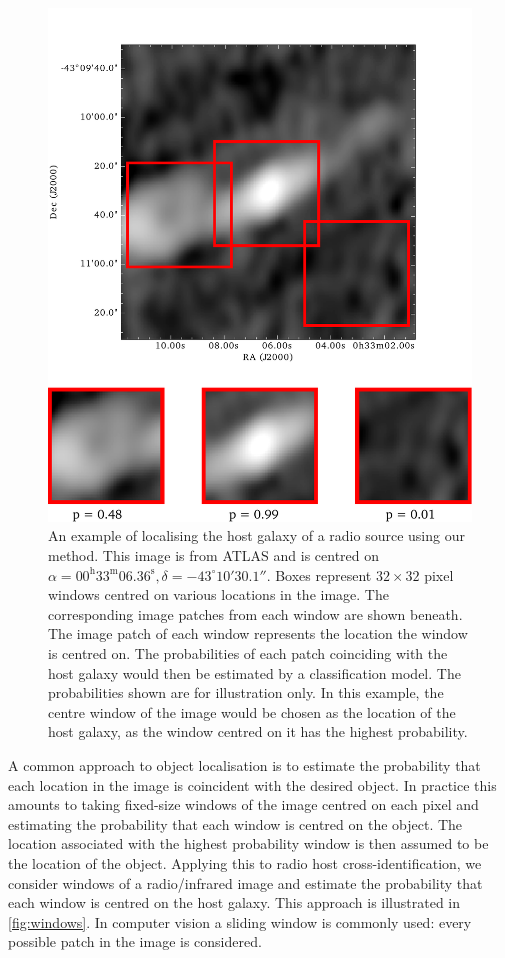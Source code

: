 \documentclass[fleqn,usenatbib,usedcolumn]{mnras}
\newcommand{\text}{\mathrm}
\begin{document}
    \begin{figure}
      \centering
      \includegraphics[width=0.8\columnwidth]{images/elais_0093C1_with_boxes}
      \caption{An example of localising the host galaxy of a radio source using
        our method. This image is from ATLAS and is centred on $\alpha =
        00^\text{h}33^\text{m}06.36^\text{s}, \delta = -43^\circ{}10'30.1''$. Boxes
        represent $32 \times 32$ pixel windows centred on various locations in
        the image. The corresponding image patches from each window are shown
        beneath. The image patch of each window represents the location the
        window is centred on. The probabilities of each patch coinciding with
        the host galaxy would then be estimated by a classification model. The
        probabilities shown are for illustration only. In this example, the
        centre window of the image would be chosen as the location of the host
        galaxy, as the window centred on it has the highest probability.}
      \label{fig:windows}
    \end{figure}

    A common approach to object localisation is to estimate the probability
    that each location in the image is coincident with the desired object. In
    practice this amounts to taking fixed-size windows of the image centred on
    each pixel and estimating the probability that each window is centred on
    the object. The location associated with the highest probability window is
    then assumed to be the location of the object. Applying this to radio host
    cross-identification, we consider windows of a radio/infrared image and
    estimate the probability that each window is centred on the host galaxy.
    This approach is illustrated in \autoref{fig:windows}.
    In computer vision a sliding window is commonly used: every possible patch
    in the image is considered.
\end{document}
